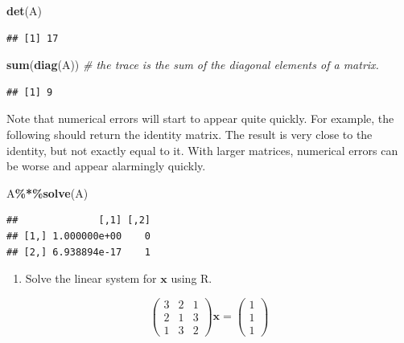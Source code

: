 \documentclass[
]{book}
\newenvironment{Shaded}{\begin{snugshade}}{\end{snugshade}}
\newcommand{\CommentTok}[1]{\textcolor[rgb]{0.56,0.35,0.01}{\textit{#1}}}
\newcommand{\FunctionTok}[1]{\textcolor[rgb]{0.13,0.29,0.53}{\textbf{#1}}}
\newcommand{\NormalTok}[1]{#1}
\newcommand{\SpecialCharTok}[1]{\textcolor[rgb]{0.81,0.36,0.00}{\textbf{#1}}}
\providecommand{\tightlist}{%
  \setlength{\itemsep}{0pt}\setlength{\parskip}{0pt}}
\theoremstyle{definition}
\theoremstyle{definition}
\theoremstyle{definition}
\theoremstyle{definition}
\theoremstyle{remark}
\begin{document}
\begin{Shaded}
\begin{Highlighting}[]
\FunctionTok{det}\NormalTok{(A)}
\end{Highlighting}
\end{Shaded}

\begin{verbatim}
## [1] 17
\end{verbatim}

\begin{Shaded}
\begin{Highlighting}[]
\FunctionTok{sum}\NormalTok{(}\FunctionTok{diag}\NormalTok{(A)) }\CommentTok{\# the trace is the sum of the diagonal elements of a matrix.}
\end{Highlighting}
\end{Shaded}

\begin{verbatim}
## [1] 9
\end{verbatim}

Note that numerical errors will start to appear quite quickly. For example, the following should return the identity matrix. The result is very close to the identity, but not exactly equal to it. With larger matrices, numerical errors can be worse and appear alarmingly quickly.

\begin{Shaded}
\begin{Highlighting}[]
\NormalTok{A}\SpecialCharTok{\%*\%}\FunctionTok{solve}\NormalTok{(A)}
\end{Highlighting}
\end{Shaded}

\begin{verbatim}
##              [,1] [,2]
## [1,] 1.000000e+00    0
## [2,] 6.938894e-17    1
\end{verbatim}

\begin{enumerate}
\def\labelenumi{\arabic{enumi}.}
\tightlist
\item
  Solve the linear system for \(\mathbf x\) using R.
\end{enumerate}

\[\left(\begin{array}{ccc} 3&2&1\\2&1&3\\ 1&3&2\end{array}\right) \mathbf x=\left(\begin{array}{c} 1\\1\\ 1\end{array}\right)\]
\end{document}
